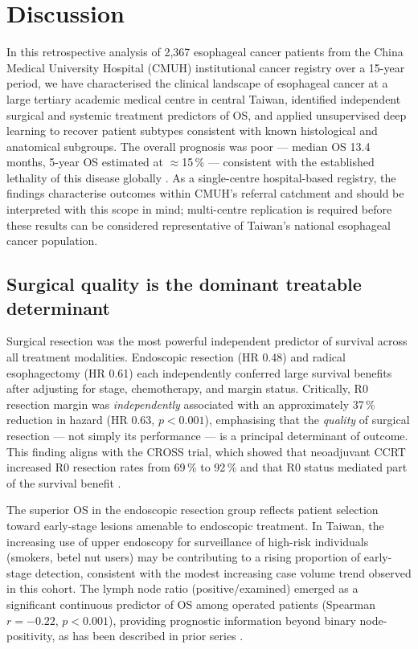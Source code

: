 \documentclass[12pt,a4paper]{article}
\begin{document}
\section{Discussion}

In this retrospective analysis of 2,367 esophageal cancer patients from the
China Medical University Hospital (CMUH) institutional cancer registry over
a 15-year period, we have characterised the clinical landscape of
esophageal cancer at a large tertiary academic medical centre in central
Taiwan, identified independent surgical and systemic treatment predictors of
OS, and applied unsupervised deep learning to recover patient subtypes
consistent with known histological and anatomical subgroups. The overall
prognosis was poor --- median OS 13.4 months, 5-year OS estimated at
$\approx$15\,\% --- consistent with the established lethality of this disease
globally \cite{Sung2021}. As a single-centre hospital-based registry, the
findings characterise outcomes within CMUH's referral catchment and should
be interpreted with this scope in mind; multi-centre replication is required
before these results can be considered representative of Taiwan's national
esophageal cancer population.

\subsection{Surgical quality is the dominant treatable determinant}
Surgical resection was the most powerful independent predictor of survival
across all treatment modalities. Endoscopic resection (HR 0.48) and
radical esophagectomy (HR 0.61) each independently conferred large
survival benefits after adjusting for stage, chemotherapy, and margin
status. Critically, R0 resection margin was \textit{independently}
associated with an approximately 37\,\% reduction in hazard (HR 0.63, $p < 0.001$),
emphasising that the \textit{quality} of surgical resection --- not
simply its performance --- is a principal determinant of outcome. This
finding aligns with the CROSS trial, which showed that neoadjuvant CCRT
increased R0 resection rates from 69\,\% to 92\,\% and that R0 status
mediated part of the survival benefit \cite{vanHagen2012}.

The superior OS in the endoscopic resection group reflects patient
selection toward early-stage lesions amenable to endoscopic treatment.
In Taiwan, the increasing use of upper endoscopy for surveillance of
high-risk individuals (smokers, betel nut users) may be contributing to
a rising proportion of early-stage detection, consistent with the modest
increasing case volume trend observed in this cohort. The lymph node ratio
(positive/examined) emerged as a significant continuous predictor of OS
among operated patients (Spearman $r = -0.22$, $p < 0.001$), providing
prognostic information beyond binary node-positivity, as has been
described in prior series \cite{Rice2017}.
\end{document}
